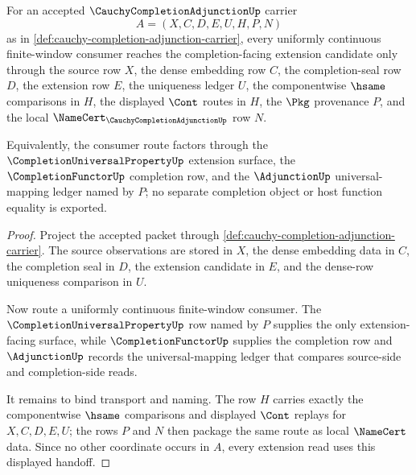 
\begin{theorem}
\label{thm:cauchy-completion-adjunction-extension-handoff}
For an accepted $\CauchyCompletionAdjunctionUp$ carrier
$$
A=(X,C,D,E,U,H,P,N)
$$
as in \autoref{def:cauchy-completion-adjunction-carrier}, every uniformly continuous finite-window consumer reaches the completion-facing extension candidate only through the source row $X$, the dense embedding row $C$, the completion-seal row $D$, the extension row $E$, the uniqueness ledger $U$, the componentwise $\hsame$ comparisons in $H$, the displayed $\Cont$ routes in $H$, the $\Pkg$ provenance $P$, and the local $\NameCert_{\CauchyCompletionAdjunctionUp}$ row $N$.

Equivalently, the consumer route factors through the $\CompletionUniversalPropertyUp$ extension surface, the $\CompletionFunctorUp$ completion row, and the $\AdjunctionUp$ universal-mapping ledger named by $P$; no separate completion object or host function equality is exported.
\end{theorem}
\begin{proof}
Project the accepted packet through \autoref{def:cauchy-completion-adjunction-carrier}. The source observations are stored in $X$, the dense embedding data in $C$, the completion seal in $D$, the extension candidate in $E$, and the dense-row uniqueness comparison in $U$.

Now route a uniformly continuous finite-window consumer. The $\CompletionUniversalPropertyUp$ row named by $P$ supplies the only extension-facing surface, while $\CompletionFunctorUp$ supplies the completion row and $\AdjunctionUp$ records the universal-mapping ledger that compares source-side and completion-side reads.

It remains to bind transport and naming. The row $H$ carries exactly the componentwise $\hsame$ comparisons and displayed $\Cont$ replays for $X,C,D,E,U$; the rows $P$ and $N$ then package the same route as local $\NameCert$ data. Since no other coordinate occurs in $A$, every extension read uses this displayed handoff.
\end{proof}

